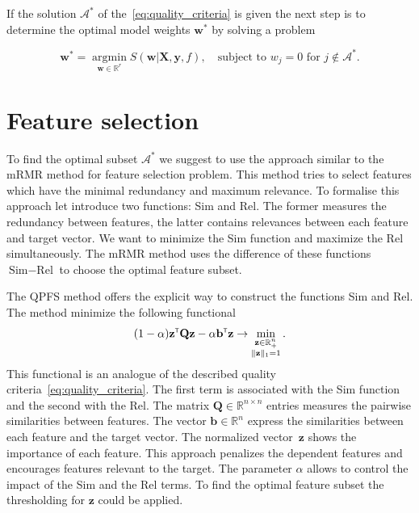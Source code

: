 \documentclass[a4paper,12pt]{article}
\theoremstyle{plain} %
\theoremstyle{definition} %
\theoremstyle{remark} %
\newcommand{\bw}{\mathbf{w}}
\newcommand{\bQ}{\mathbf{Q}}
\newcommand{\by}{\mathbf{y}}
\newcommand{\bz}{\mathbf{z}}
\newcommand{\bX}{\mathbf{X}}
\newcommand{\cA}{\mathcal{A}}
\newcommand{\bbR}{\mathbb{R}}
\newcommand{\T}{{\text{\tiny\sffamily\upshape\mdseries T}}}
\newcommand{\argmin}{\mathop{\arg \min}\limits}
\begin{document}
	If the solution $\cA^*$ of the~\ref{eq:quality_criteria} is given the next step is to determine the optimal model weights	$\bw^*$ by solving a problem
	
	\begin{equation}
		\bw^* = \argmin_{\bw \in \bbR^r} S(\bw | \bX, \by, f), \quad \text{subject to } w_j = 0 \text{ for } j \notin \cA^*.
		\label{eq:reduced_error_function}
	\end{equation}
	
	\section*{Feature selection}
	
	To find the optimal subset $\cA^*$ we suggest to use the approach similar to the mRMR method for feature selection problem. 
	This method tries to select features which have the minimal redundancy and maximum relevance.
	To formalise this approach let introduce two functions: Sim and Rel. 
	The former measures the redundancy between features, the latter contains relevances between each feature and target vector. 
	We want to minimize the Sim function and maximize the Rel simultaneously.
	The mRMR method uses the difference of these functions
	$\text{Sim} -\text{Rel}$ to choose the optimal feature subset.
	
	The QPFS method offers the explicit way to construct the functions Sim and Rel. 
	The method minimize the following functional
	\begin{equation}
		(1 - \alpha) \bz^{\T} \bQ \bz - \alpha \mathbf{b}^{\T} \bz \rightarrow \min_{\substack{\bz \in \bbR^n_+ \\ \|\bz\|_1 = 1}}.
		\label{eq:quadratic_problem}
	\end{equation}
	This functional is an analogue of the described quality criteria~\ref{eq:quality_criteria}.
  	The first term is associated with the Sim function and the second with the Rel. 
  	The matrix $\bQ \in \bbR^{n \times n}$ entries measures the pairwise similarities between features. 
  	The vector $\mathbf{b} \in \bbR^n$ express the similarities between each feature and the target vector.
  	The normalized vector~$\bz$ shows the importance of each feature. 
  	This approach penalizes the dependent features and encourages features relevant to the target. 
  	The parameter $\alpha$ allows to control the impact of the Sim and the Rel terms.
  	To find the optimal feature subset the thresholding for $\bz$ could be applied.
  	
\end{document}
